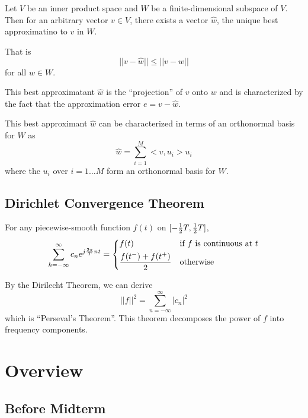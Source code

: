 \documentclass[12pt]{article}
\begin{document}
\begin{theorem}
Let $V$ be an inner product space and $W$ be a finite-dimensional subspace of $V$. Then for an arbitrary vector $v\in V$, there exists a vector $\hat w$, the unique best approximatino to $v$ in $W$.

That is \[ || v - \hat w|| \leq ||v - w|| \] for all $w\in W$.

This best approximatant $\hat w$ is the ``projection'' of $v$ onto $w$ and is characterized by the fact that the approximation error $e = v - \hat w$.
\end{theorem}

This best approximant $\hat w$ can be characterized in terms of an orthonormal basis for $W$ as \[ \hat w = \sum_{i=1}^M <v, u_i> u_i \] where the $u_i$ over $i = 1\dots M$ form an orthonormal basis for $W$.

\subsection{Dirichlet Convergence Theorem}
For any piecewise-smooth function $f(t)$ on $[-\frac{1}{2} T, \frac{1}{2} T]$, \[ \sum_{h=-\infty}^\infty c_n e^{j\frac{2\pi}{T} nt} =
\begin{dcases*}
f(t) & if $f$ is continuous at $t$\\
\frac{f(t^-) + f(t^+)}{2} & otherwise
\end{dcases*}\]

By the Dirilecht Theorem, we can derive \[ {||f||}^2 = \sum_{n=-\infty}^\infty |c_n|^2 \] which is ``Perseval's Theorem''. This theorem decomposes the power of $f$ into frequency components.

\section{Overview}
\subsection{Before Midterm}
\end{document}
